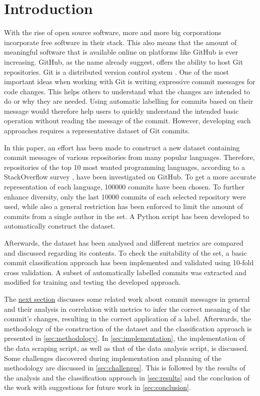 \section{Introduction}
\label{sec:introduction}

With the rise of open source software, more and more big corporations
incorporate free software in their stack. This also means that the amount of
meaningful software that is available online on platforms like GitHub
\cite{github} is ever increasing. GitHub, as the name already suggest, offers
the ability to host Git repositories. Git is a distributed version control
system \cite{git}. One of the most important ideas when working with Git
is writing expressive commit messages for code changes. This helps others
to understand what the changes are intended to do or why they are needed.
Using automatic labelling for commits based on their message would therefore
help users to quickly understand the intended basic operation without reading
the message of the commit. However, developing such approaches requires a
representative dataset of Git commits.

In this paper, an effort has been made to construct a new dataset containing
commit messages of various repositories from many popular languages. Therefore,
repositories of the top 10 most wanted programming languages, according to
a StackOverflow survey \cite{so-survey}, have been investigated on GitHub. To get a more accurate
representation of each language, 100000 commits have been chosen. To further
enhance diversity, only the last 10000 commits of each selected repository
were used, while also a general restriction has been enforced to limit the
amount of commits from a single author in the set. A Python script has been
developed to automatically construct the dataset.

Afterwards, the dataset has been analysed and different metrics are
compared and discussed regarding its contents. To check the
suitability of the set, a basic commit classification approach has been
implemented and validated using 10-fold cross validation. A subset of
automatically labelled commits was extracted and modified for training and
testing the developed approach.

The \hyperref[sec:related-work]{next section} discusses some related work about commit messages in
general and their analysis in correlation with metrics to infer the
correct meaning of the commit's changes, resulting in the correct application
of a label. Afterwards, the methodology of the
construction of the dataset and the classification approach is presented
in \autoref{sec:methodology}. In \autoref{sec:implementation}, the
implementation of the data scraping script, as well as that of the data analysis
script, is discussed. Some challenges discovered during implementation and
planning of the methodology are discussed in \autoref{sec:challenges}.
This is followed by the results of the analysis and
the classification approach in \autoref{sec:results} and the conclusion of the
work with suggestions for future work in \autoref{sec:conclusion}.
